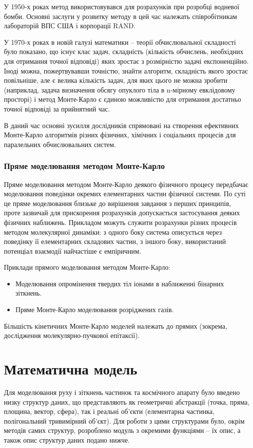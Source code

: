 \documentclass[a4paper,12pt]{article}
\begin{document}
У 1950-х роках метод використовувався для розрахунків при розробці водневої бомби. Основні заслуги у розвитку методу в цей час належать співробітникам лабораторій ВПС США і корпорації RAND.

У 1970-х роках в новій галузі математики -- теорії обчислювальної складності було показано, що існує клас задач, складність (кількість обчислень, необхідних для отримання точної відповіді) яких зростає з розмірністю задачі експоненційно. Іноді можна, пожертвувавши точністю, знайти алгоритм, складність якого зростає повільніше, але є велика кількість задач, для яких цього не можна зробити (наприклад, задача визначення обсягу опуклого тіла в n-мірному евклідовому просторі) і метод Монте-Карло є єдиною можливістю для отримання достатньо точної відповіді за прийнятний час.

В даний час основні зусилля дослідників спрямовані на створення ефективних Монте-Карло алгоритмів різних фізичних, хімічних і соціальних процесів для паралельних обчислювальних систем.

\subsubsection{Пряме моделювання методом Монте-Карло}
Пряме моделювання методом Монте-Карло деякого фізичного процесу передбачає моделювання поведінки окремих елементарних частин фізичної системи. По суті це пряме моделювання близьке до вирішення завдання з перших принципів, проте зазвичай для прискорення розрахунків допускається застосування деяких фізичних наближень. Прикладом можуть служити розрахунки різних процесів методом молекулярної динаміки: з одного боку система описується через поведінку її елементарних складових частин, з іншого боку, використаний потенціал взаємодії найчастіше є емпіричним.

Приклади прямого моделювання методом Монте-Карло:
\renewcommand{\labelitemi}{$\circ$}
\begin{itemize}
\item Моделювання опромінення твердих тіл іонами в наближенні бінарних зіткнень.
\item Пряме Монте-Карло моделювання розріджених газів.
\end{itemize}
Більшість кінетичних Монте-Карло моделей належать до прямих (зокрема, дослідження молекулярно-пучкової епітаксії).

\newpage

\section{Математична модель}
Для моделювання руху і зіткнень частинок та космічного апарату було введено низку структур даних, що представляють як геометричні абстракції (точка, пряма, площина, вектор, сфера), так і реальні об’єкти (елементарна частинка, полігональний тривимірний об’єкт). Для роботи з цими структурами було, окрім методів самих структур, розроблено модуль з окремими функціями -- їх опис, а також опис структур даних подано нижче.
\end{document}
